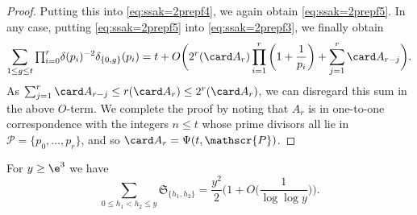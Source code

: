 \documentclass[12pt, reqno, twoside, letterpaper]{amsart}
\begin{document}
\begin{jetsam}
\begin{proof}
Putting this into \eqref{eq:ssak=2prepf4}, we again obtain 
\eqref{eq:ssak=2prepf5}.
%
In any case, putting \eqref{eq:ssak=2prepf5} into 
\eqref{eq:ssak=2prepf3}, we finally obtain 
\[ 
  \sum_{1 \le g \le t}
  {\textstyle \prod_{i = 0}^r } \delta(p_i)^{-2}\delta_{\{0,g\}}(p_i) 
   =
    t 
     + 
      O\bigg(
        2^r(\card A_r)\prod_{i = 1}^r\bigg(1 + \frac{1}{p_i}\bigg) 
        + \sum_{j = 1}^r \card A_{r - j} 
       \bigg).
\]
%
As 
$
 \sum_{j = 1}^r \card A_{r - j} 
  \le r(\card A_r) 
   \le 2^r(\card A_r)
$, 
we can disregard this sum in the above $O$-term.
%
We complete the proof by noting that $A_r$ is in one-to-one 
correspondence with the integers $n \le t$ whose prime divisors 
all lie in $\mathscr{P} = \{p_0,\ldots,p_r\}$, and so  
$\card A_{r} = \Psi(t,\mathscr{P})$.
\end{proof}

\begin{proposition}
 \label{prop:sssak=2}
%
For $y \ge \e^3$ we have 
\[
  \sum_{0 \le h_1 < h_2 \le y}
   \mathfrak{S}_{\{h_1,h_2\}}
    =
     \frac{y^2}{2} 
      \bigg(1 + O\bigg(\frac{1}{\log\log y}\bigg)\bigg).
\]
\end{proposition}


\end{jetsam}
\end{document}
